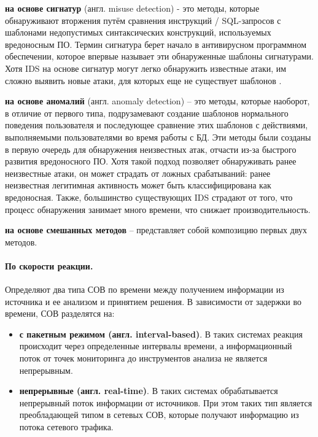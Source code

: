 \textbf{на основе сигнатур} (англ. misuse detection) - это методы, которые обнаруживают вторжения путём сравнения инструкций / SQL-запросов с шаблонами недопустимых синтаксических конструкций, используемых вредоносным ПО. Термин сигнатура берет начало в антивирусном программном обеспечении, которое впервые называет эти обнаруженные шаблоны сигнатурами. Хотя IDS на основе сигнатур могут легко обнаружить известные атаки, им сложно выявить новые атаки, для которых еще не существует шаблонов \cite{NetSecChristos}.

\textbf{на основе аномалий} (англ. anomaly detection) -- это методы, которые наоборот, в отличие от первого типа, подрузамевают создание шаблонов нормального поведения пользователя и последующее сравнение этих шаблонов с действиями, выполняемыми пользователями во время работы с БД. Эти методы были созданы в первую очередь для обнаружения неизвестных атак, отчасти из-за быстрого развития вредоносного ПО. Хотя такой подход позволяет обнаруживать ранее неизвестные атаки, он может страдать от ложных срабатываний: ранее неизвестная легитимная активность может быть классифицирована как вредоносная. Также, большинство существующих IDS страдают от того, что процесс обнаружения занимает много времени, что снижает производительность. 

\textbf{на основе смешанных методов} -- представляет собой композицию первых двух методов.

\paragraph*{По скорости реакции.}

Определяют два типа СОВ по времени между получением информации из источника и ее
анализом и принятием решения. В зависимости от задержки во времени, СОВ разделятся на:
\begin{itemize}
	\item \textbf{с пакетным режимом (англ. interval-based)}. В таких системах реакция
	происходит через определенные интервалы времени, а информационный поток от точек
	мониторинга до инструментов анализа не является непрерывным.

	\item \textbf{непрерывные (англ. real-time)}. В таких системах обрабатывается
	непрерывный поток информации от источников. При этом таких тип является преобладающей
	типом в сетевых СОВ, которые получают информацию из потока сетевого трафика.
\end{itemize}


